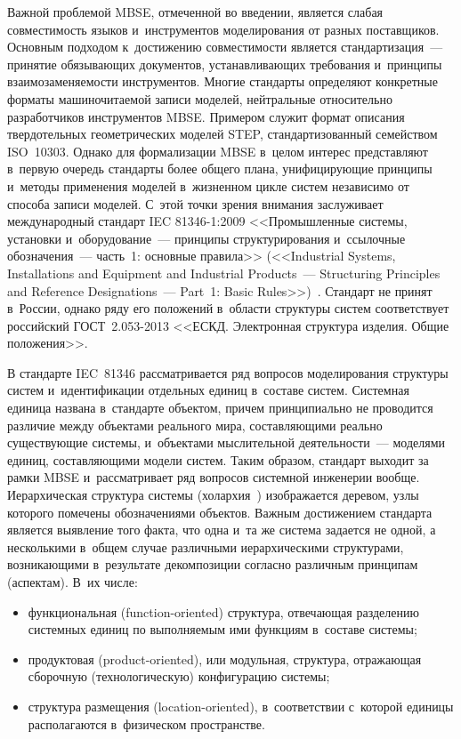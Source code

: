 \begin{multicols}{2}
   Важной проблемой MBSE, отмеченной во введении, является слабая 
совместимость языков и~инструмен\-тов моделирования от разных поставщиков. 
Основным подходом к~достижению совместимости является стандартизация~--- 
принятие обязывающих документов, устанавливающих требования и~принципы 
взаимозаменяемости инструментов. Многие стандарты определяют конкретные 
форматы машиночитаемой записи моделей, нейтральные относительно 
разработчиков инструментов MBSE. Примером служит формат описания 
твердотельных геометрических моделей STEP, стандартизованный семейством 
ISO~10303. Однако для формализации MBSE в~целом интерес представляют 
в~первую очередь стандарты более общего плана, унифицирующие принципы 
и~методы применения моделей в~жизненном цикле систем независимо от 
способа записи моделей. С~этой точки зрения внимания заслуживает 
международный стандарт IEC 81346-1:2009 <<Промышленные системы, 
установки и~обору\-до\-ва\-ние~--- принципы структурирования и~ссылочные 
обозначения~--- часть~1: основные правила>> (<<Industrial Systems, 
Installations and Equipment and Industrial Products~--- Structuring Principles and 
Reference Designations~--- Part~1: Basic Rules>>)~\cite{4-kov}. Стандарт не 
принят в~России, однако ряду его положений в~области структуры систем 
соответствует российский ГОСТ~2.053-2013 <<ЕСКД. Электронная структура 
изделия. Общие положения>>.
   
   В стандарте IEC~81346 рассматривается ряд вопросов моделирования 
структуры систем и~идентификации отдельных единиц в~составе систем. 
Системная единица названа в~стандарте объектом, причем принципиально не 
проводится различие между объектами реального мира, составляющими 
реально существующие системы, и~объектами мыслительной деятельности~--- 
моделями единиц, составляющими модели систем. Таким образом, стандарт 
выходит за рамки MBSE и~рассматривает ряд вопросов системной инженерии 
вообще. Иерар\-хи\-че\-ская структура системы (холархия~\cite{3-kov}) 
изображается деревом, узлы которого помечены обозначениями объектов. 
Важным достижением стандарта является выявление того факта, что одна и~та 
же система задается не одной, а несколькими в~общем случае различными 
иерархическими структурами, возникающими в~результате декомпозиции 
согласно различным принципам (аспектам). В~их числе:
   \begin{itemize}
\item функциональная (function-oriented) структура, отвечающая разделению 
системных единиц по выполняемым ими функциям в~составе сис\-темы;
\item продуктовая (product-oriented), или модульная, структура, отражающая 
сборочную (технологическую) конфигурацию сис\-темы;
\item структура размещения (location-oriented), в~соответствии с~которой 
единицы располагаются в~физическом пространстве.
\end{itemize}


\end{multicols}
